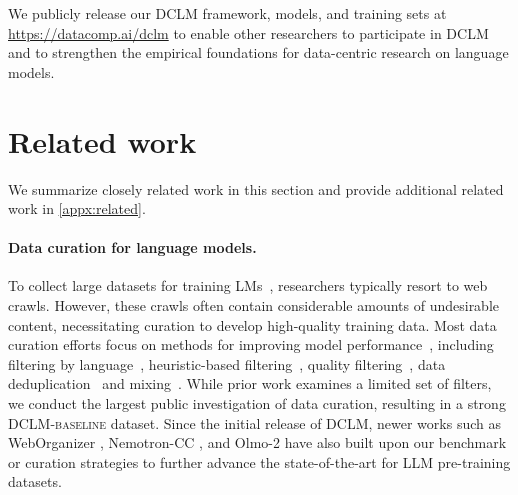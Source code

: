 We publicly release our \textsc{DCLM} framework, models, and training sets at \url{https://datacomp.ai/dclm} to enable other researchers to participate in \textsc{DCLM} and to strengthen the empirical foundations for data-centric research on language models.

\section{Related work}
\label{sec:related}

We summarize closely related work in this section and provide additional related work in \ref{appx:related}.

\paragraph{Data curation for language models.} To collect large datasets for training LMs~\citep{gpt3}, researchers typically resort to web crawls. However, these crawls often contain considerable amounts of undesirable content, necessitating curation to develop high-quality training data. Most data curation efforts focus on methods for improving model performance~\citep{raffel2020exploring, gpt3, wenzek-etal-2020-ccnet, gopher, refinedweb, soldaini2024dolma}, including filtering by language~\citep{NEURIPS2019_c04c19c2, raffel2020exploring, xue-etal-2021-mt5, NEURIPS2022_ce9e92e3}, heuristic-based filtering~\citep{pile, gopher, refinedweb, Chen2021EvaluatingLL, soldaini2024dolma}, quality filtering~\citep{wenzek-etal-2020-ccnet,du2022glam, longpre2023pretrainers, xie2023data,sachdeva2024train}, data deduplication~\citep{10.1145/1645953.1646283,Lee2021DeduplicatingTD} and mixing~\citep{xie2023doremi, cerebras2023slimpajama, albalak2023efficient}. While prior work examines a limited set of filters, we conduct the largest public investigation of data curation, resulting in a strong \textsc{DCLM-baseline} dataset. Since the initial release of DCLM, newer works such as WebOrganizer \citep{wettig2025organize}, Nemotron-CC \citep{su2024nemotroncc}, and Olmo-2 \citep{olmo20252olmo2furious} have also built upon our benchmark or curation strategies to further advance the state-of-the-art for LLM pre-training datasets.

